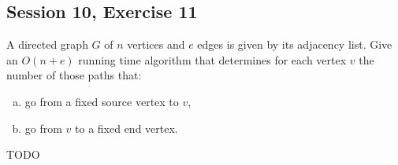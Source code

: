 \subsection {Session 10, Exercise 11}


A directed graph $G$ of $n$ vertices and $e$ edges is given by its adjacency list. Give an $O(n+e)$ running time algorithm that determines for each vertex $v$ the number of those paths that:

\begin{enumerate}[a)]
    \item go from a fixed source vertex to $v$,
    \item go from $v$ to a fixed end vertex.
\end{enumerate}



TODO